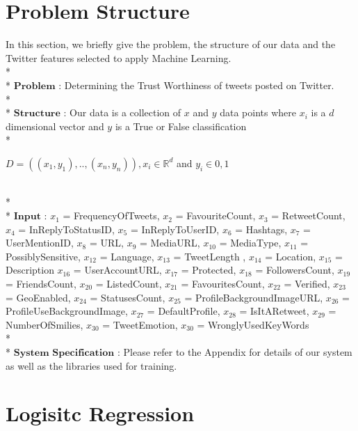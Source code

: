 \section{Problem Structure}
In this section, we briefly give the problem, the structure of our data and the Twitter features selected to apply Machine Learning. \\*\\*
$\mathbf{Problem}$ : Determining the Trust Worthiness of tweets posted on Twitter.\\*\\*
$\mathbf{Structure}$ : Our data is a collection of $x$ and $y$ data points where $x_i$ is a $d$ dimensional vector and $y$ is a True or False classification\\*
\centerline{$D = ((x_1,y_1),..,(x_n,y_n)) , x_i \in \mathbb{R}^d$  and  $y_i \in {0,1}$}\\*\\*
$\mathbf{Input}$ : $x_1$ = FrequencyOfTweets, $x_2$ = FavouriteCount, $x_3$ = RetweetCount, $x_4$ = InReplyToStatusID, $x_5$ = InReplyToUserID, $x_6$ = Hashtags, $x_7$ = UserMentionID, $x_8$ = URL, $x_9$ = MediaURL, $x_{10}$ = MediaType, $x_{11}$ = PossiblySensitive, $x_{12}$ = Language, $x_{13}$ = TweetLength , $x_{14}$ = Location, $x_{15}$ = Description $x_{16}$ = UserAccountURL, $x_{17}$ = Protected, $x_{18}$ = FollowersCount, $x_{19}$ = FriendsCount, $x_{20}$ = ListedCount, $x_{21}$ = FavouritesCount, $x_{22}$ = Verified, $x_{23}$ = GeoEnabled, $x_{24}$ = StatusesCount, $x_{25}$ = ProfileBackgroundImageURL, $x_{26}$ = ProfileUseBackgroundImage, $x_{27}$ = DefaultProfile, $x_{28}$ = IsItARetweet, $x_{29}$ =  NumberOfSmilies, $x_{30}$ = TweetEmotion, $x_{30}$ = WronglyUsedKeyWords\\*\\*
$\mathbf{System}$ $\mathbf{Specification}$ : Please refer to the Appendix for details of our system as well as the libraries used for training. 
\newpage

\section{Logisitc Regression}
